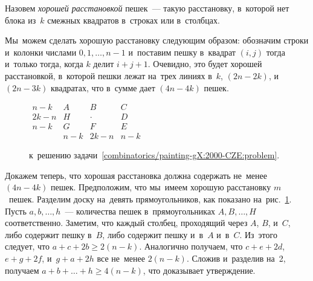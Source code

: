 \ifincludesolutions
Назовем \emph{хорошей расстановкой} пешек~--- такую расстановку, в~которой нет
блока из~$k$ смежных квадратов в~строках или в~столбцах.
\par
Мы~можем сделать хорошую расстановку следующим образом: обозначим строки
и~колонки числами $0, 1, \ldots, n - 1$ и~поставим пешку в~квадрат $(i, j)$
тогда и~только тогда, когда $k$ делит $i + j + 1$.
Очевидно, это будет хорошей расстановкой, в~которой пешки лежат на~трех линиях
в~$k$, $(2 n - 2 k)$, и~$(2 n - 3 k)$ квадратах, что в~сумме дает
$(4 n - 4 k)$ пешек.
\par
\begin{figure}[ht]\begin{center}
\(\begin{matrix}
    n - k    &    A    &     B     &    C    \\[2ex]
    2 k - n  &    H    &   \cdot   &    D    \\[2ex]
    n - k    &    G    &     F     &    E    \\[2ex]
             &  n - k  &  2 k - n  &  n - k
\end{matrix}\)
\caption{к~решению задачи~\ref{combinatorics/painting-gX:2000-CZE:problem}.}%
\label{combinatorics/painting-gX:2000-CZE:solution:fig}
\end{center}\end{figure}
Докажем теперь, что хорошая расстановка должна содержать не~менее
$(4 n - 4 k)$ пешек.
Предположим, что мы~имеем хорошую расстановку $m$~пешек.
Разделим доску на~девять прямоугольников, как показано
на~рис.~\ref{combinatorics/painting-gX:2000-CZE:solution:fig}.
Пусть $a, b, \ldots, h$~--- количества пешек в~прямоугольниках
$A, B, \ldots, H$ соответственно.
Заметим, что каждый столбец, проходящий через $A$, $B$, и~$C$, либо содержит
пешку в~$B$, либо содержит пешку и~в~$A$ и~в~$C$.
Из~этого следует, что $a + c + 2 b \geq 2 (n - k)$.
Аналогично получаем, что $c + e + 2 d$, $e + g + 2 f$, и~$g + a + 2 h$ все
не~менее $2 (n - k)$.
Сложив и~разделив на~2, получаем $a + b + \ldots + h \geq 4 (n - k)$, что
доказывает утверждение.
\fi %

\endgroup %


